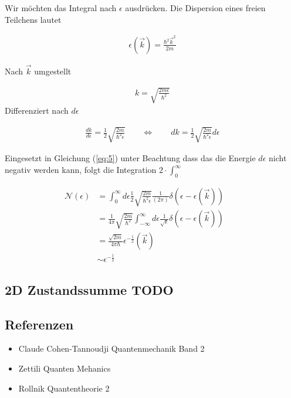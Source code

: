 Wir möchten das Integral nach \(\epsilon\) ausdrücken. Die Dispersion eines freien Teilchens lautet

\begin{align}
  \label{eq:6}
  \epsilon(\vec k) = \frac{\hbar^2 \vec k^2}{2m} 
\end{align}

Nach \(\vec k\) umgestellt

\begin{align}
  \label{eq:7}
  k = \sqrt{\frac{2m \epsilon}{\hbar^2}}
\end{align}
Differenziert nach \(d\epsilon\)

\begin{align}
  \label{eq:8}
  \frac{d k}{d\epsilon} = \frac{1}{2} \sqrt{\frac{2m}{\hbar^2  \epsilon}} \qquad \Leftrightarrow \qquad dk = \frac{1}{2} \sqrt{\frac{2m}{\hbar^2  \epsilon}} d\epsilon
\end{align}

Eingesetzt in Gleichung (\ref{eq:5}) unter Beachtung dass das die Energie \(d\epsilon\) nicht negativ werden kann, folgt die Integration \(2\cdot\int_{0}^\infty\)

\begin{align}
  \label{eq:9}
   \mathcal N(\epsilon) &= \int_{0}^{\infty} d\epsilon \frac{1}{2} \sqrt{\frac{2m}{\hbar^2  \epsilon}}  \frac{ 1}{(2\pi)} \delta(\epsilon - \epsilon(\vec k)) \qquad \\
 &= \frac{1}{4\pi} \sqrt{\frac{2m}{\hbar^2}} \int_{-\infty}^{\infty} d\epsilon \frac{1}{\sqrt{\epsilon}}   \delta(\epsilon - \epsilon(\vec k)) \qquad \\
 &= \frac{\sqrt{2m}}{4\pi\hbar}  \epsilon^{-\frac{1}{2}}(\vec k)  \qquad \\
&\sim \epsilon^{-\frac{1}{2}}
\end{align}

\subsection*{2D Zustandssumme TODO}








\subsection*{Referenzen}
\begin{itemize}
\item Claude Cohen-Tannoudji Quantenmechanik Band 2
\item Zettili Quanten Mehanics
\item Rollnik Quantentheorie 2
\end{itemize}


